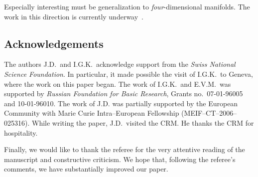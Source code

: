 \documentclass[pdftex]{sigma}
\begin{document}
Especially interesting must be generalization to \emph{four}-dimensional manifolds. The work in this direction is currently underway~\cite{K3324}.


\subsection*{Acknowledgements}

The authors J.D.\ and I.G.K.\ acknowledge support from the \emph{Swiss National Science
Foundation}. In particular, it made possible the visit of I.G.K.\ to Geneva, where the work on
this paper began.
The work of I.G.K.\ and E.V.M.\ was supported by \emph{Russian Foundation
for Basic Research}, Grants no.~07-01-96005 and 10-01-96010.
The work of J.D. was partially supported by the {European Community} with Marie Curie
Intra--European Fellowship (MEIF--CT--2006--025316). While writing the paper, J.D.\ visited
the CRM. He thanks the CRM for hospi\-tality.

Finally, we would like to thank the referee for the very attentive reading of the manuscript and constructive criticism. We hope that, following the referee's comments, we have substantially improved our paper.
\end{document}
